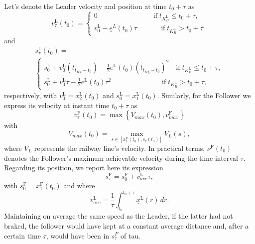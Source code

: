 Let's denote the Leader velocity and position at time $t_0+\tau$ as
%
\begin{equation*}
	v_{\tau}^\mathrm{L}\left(t_0\right)=
	\begin{cases}
		0 \qquad \qquad \qquad \quad  \quad \text{if} \; t_{K_B^\mathrm{L}} \leq t_0 + \tau, \\
		v_0^\mathrm{L} -\underline{e}^L\left(t_0\right)\tau \qquad \quad \; \, \text{if} \; t_{K_B^\mathrm{L}} > t_0 + \tau_,
	\end{cases}
\end{equation*}
%
and
%
\begin{multline*}
	s_{\tau}^\mathrm{L}\left(t_0\right)=\\
	\begin{cases}
		s_0^\mathrm{L} + v_0^\mathrm{L}\left(t_{t_{K_B^\mathrm{L}}-t_0}\right)-\frac{1}{2}\underline{e}^\mathrm{L}\left(t_0\right)\left(t_{t_{K_B^\mathrm{L}}-t_0}\right)^2    \quad \text{if} \; t_{K_B^\mathrm{L}} \leq t_0 + \tau, \\
		s_0^\mathrm{L} + v_0^\mathrm{L} \tau - \frac{1}{2}\underline{e}^\mathrm{L}\left(t_0\right) \tau^2 \; \qquad \quad \qquad \qquad \text{if} \; t_{K_B^\mathrm{L}} > t_0 + \tau,
	\end{cases}
\end{multline*}
%
respectively, with $v_0^\mathrm{L} = x_2^\mathrm{L}\left(t_0\right)$ and $s_0^\mathrm{L} = x_1^\mathrm{L}\left(t_0\right)$. Similarly, for the Follower we express its velocity at instant time $t_0+\tau$ as
%
\begin{equation*}
	v_\tau^\mathrm{F}\left(t_0\right) = \max \left\{V_{\textit{max}}\left(t_0\right), v_{max}^\mathrm{F} \right\}
\end{equation*}
with
\begin{equation*}
	V_{\textit{max}}\left(t_0\right)= \max_{s\in \left[x_1^\mathrm{F}\left(t_0\right),s_{\tau}\left(t_0\right)\right]} V_{\textit{L}}\left(s\right),
\end{equation*}
where $V_{\textit{L}}$ represents the railway line's velocity. In practical terms, $\nu^\mathrm{F}\left(t_0\right)$ denotes the Follower's maximum achievable velocity during the time interval $\tau$. 
Regarding its position, we report here its expression
\begin{equation*}
	s_{\tau}^\mathrm{F} = s_0^\mathrm{F} + v_{\textit{ave}}^\mathrm{L} \tau,
\end{equation*}
with $s_0^\mathrm{F} = x_1^\mathrm{F}\left(t_0\right)$ and where
\begin{equation*}
	v_{\textit{ave}}^\mathrm{L} = \frac{1}{\tau} \int_{t_0}^{t_0+\tau} \underline{x}^\mathrm{L} \left(r\right)  \,dr.
\end{equation*}
Maintaining on average the same speed as the Leader, if the latter had not braked, the follower would have kept at a constant average distance and, after a certain time $\tau$, would have been in $s^F_\tau$ of tau.

